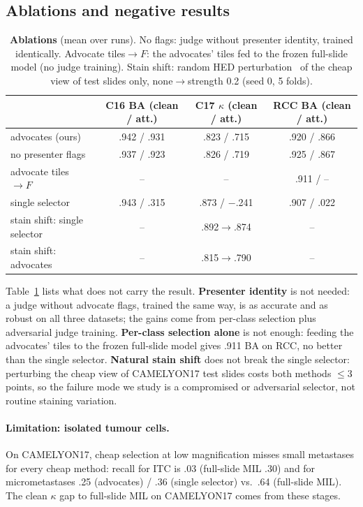 \documentclass[runningheads]{llncs}
\begin{document}
\subsection{Ablations and negative results}
\begin{table}[t]\centering
\caption{\textbf{Ablations} (mean over runs). No flags: judge without presenter identity, trained identically. Advocate tiles$\to F$: the advocates' tiles fed to the frozen full-slide model (no judge training). Stain shift: random HED perturbation~\cite{tellez2019stain} of the cheap view of test slides only, none$\to$strength 0.2 (seed 0, 5 folds).}\label{tab:abl}
\setlength{\tabcolsep}{4pt}
\begin{tabular}{@{}lccc@{}}\toprule
 & C16 BA (clean / att.) & C17 $\kappa$ (clean / att.) & RCC BA (clean / att.)\\\midrule
advocates (ours) & .942 / .931 & .823 / .715 & .920 / .866\\
\quad no presenter flags & .937 / .923 & .826 / .719 & .925 / .867\\
\quad advocate tiles $\to F$ & -- & -- & .911 / --\\
single selector & .943 / .315 & .873 / $-$.241 & .907 / .022\\\midrule
stain shift: single selector & -- & .892$\to$.874 & --\\
stain shift: advocates & -- & .815$\to$.790 & --\\\bottomrule
\end{tabular}\end{table}
Table~\ref{tab:abl} lists what does not carry the result. \textbf{Presenter identity} is not needed: a judge without advocate flags, trained the same way, is as accurate and as robust on all three datasets; the gains come from per-class selection plus adversarial judge training. \textbf{Per-class selection alone} is not enough: feeding the advocates' tiles to the frozen full-slide model gives .911 BA on RCC, no better than the single selector. \textbf{Natural stain shift} does not break the single selector: perturbing the cheap view of CAMELYON17 test slides costs both methods $\le$3 points, so the failure mode we study is a compromised or adversarial selector, not routine staining variation.

\paragraph{Limitation: isolated tumour cells.} On CAMELYON17, cheap selection at low magnification misses small metastases for every cheap method: recall for ITC is .03 (full-slide MIL .30) and for micrometastases .25 (advocates) / .36 (single selector) vs.\ .64 (full-slide MIL). The clean $\kappa$ gap to full-slide MIL on CAMELYON17 comes from these stages.
\end{document}
